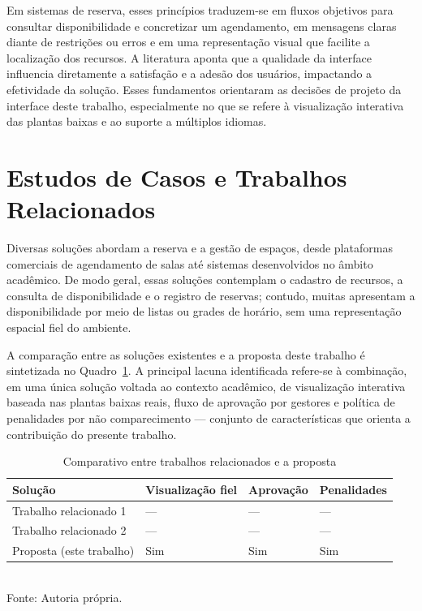 Em sistemas de reserva, esses princípios traduzem-se em fluxos objetivos para consultar disponibilidade e concretizar um agendamento, em mensagens claras diante de restrições ou erros e em uma representação visual que facilite a localização dos recursos. A literatura aponta que a qualidade da interface influencia diretamente a satisfação e a adesão dos usuários, impactando a efetividade da solução. %
Esses fundamentos orientaram as decisões de projeto da interface deste trabalho, especialmente no que se refere à visualização interativa das plantas baixas e ao suporte a múltiplos idiomas.

\section{Estudos de Casos e Trabalhos Relacionados}\label{sec:trabsrelacionados}

Diversas soluções abordam a reserva e a gestão de espaços, desde plataformas comerciais de agendamento de salas até sistemas desenvolvidos no âmbito acadêmico. %
De modo geral, essas soluções contemplam o cadastro de recursos, a consulta de disponibilidade e o registro de reservas; contudo, muitas apresentam a disponibilidade por meio de listas ou grades de horário, sem uma representação espacial fiel do ambiente.

A comparação entre as soluções existentes e a proposta deste trabalho é sintetizada no Quadro~\ref{tab:comparativo-trabalhos}. %
A principal lacuna identificada refere-se à combinação, em uma única solução voltada ao contexto acadêmico, de visualização interativa baseada nas plantas baixas reais, fluxo de aprovação por gestores e política de penalidades por não comparecimento — conjunto de características que orienta a contribuição do presente trabalho.

\begin{table}[H]
  \centering
  \caption{Comparativo entre trabalhos relacionados e a proposta}
  \label{tab:comparativo-trabalhos}
  \begin{tabular}{|p{4cm}|p{3.2cm}|p{2.4cm}|p{2.4cm}|}
    \hline
    \textbf{Solução} & \textbf{Visualização fiel} & \textbf{Aprovação} & \textbf{Penalidades} \\
    \hline
    Trabalho relacionado 1 & --- & --- & --- \\
    \hline
    Trabalho relacionado 2 & --- & --- & --- \\
    \hline
    Proposta (este trabalho) & Sim & Sim & Sim \\
    \hline
  \end{tabular}\\
  {\footnotesize Fonte: Autoria própria.}
\end{table}

\pagebreak

